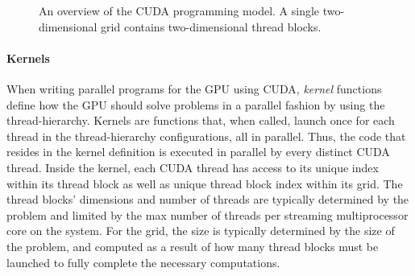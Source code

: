\begin{figure}[H]
\begin{center}
{
}
\caption{An overview of the CUDA programming model. A single two-dimensional grid contains two-dimensional thread blocks.}
\label{figure:background:graphical_processing_units:cuda-model}
\end{center}
\end{figure}

\paragraph{Kernels}
When writing parallel programs for the GPU using CUDA, \textit{kernel} functions define how the GPU should solve problems in a parallel fashion by using the thread-hierarchy.
Kernels are functions that, when called, launch once for each thread in the thread-hierarchy configurations, all in parallel.
Thus, the code that resides in the kernel definition is executed in parallel by every distinct CUDA thread.
Inside the kernel, each CUDA thread has access to its unique index within its thread block as well as unique thread block index within its grid.
The thread blocks' dimensions and number of threads are typically determined by the problem and limited by the max number of threads per streaming multiprocessor core on the system.
For the grid, the size is typically determined by the size of the problem, and computed as a result of how many thread blocks must be launched to fully complete the necessary computations.

